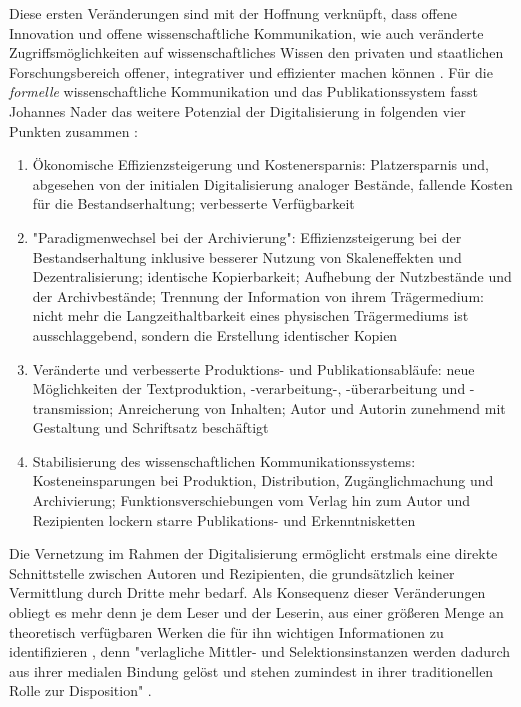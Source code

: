 Diese ersten Veränderungen sind mit der Hoffnung verknüpft, dass offene Innovation und offene wissenschaftliche Kommunikation, wie auch veränderte Zugriffsmöglichkeiten auf wissenschaftliches Wissen \cite[:109]{Naeder_2010} den privaten und staatlichen Forschungsbereich offener, integrativer und effizienter machen können \cite{Harmon_2012}. Für die \textit{formelle} wissenschaftliche Kommunikation und das Publikationssystem fasst Johannes Nader das weitere Potenzial der Digitalisierung in folgenden vier Punkten zusammen \cite[:66-76]{Naeder_2010}:
\begin{enumerate}
\item Ökonomische Effizienzsteigerung und Kostenersparnis: Platzersparnis und, abgesehen von der initialen Digitalisierung analoger Bestände, fallende Kosten für die Bestandserhaltung; verbesserte Verfügbarkeit
\item "Paradigmenwechsel bei der Archivierung": Effizienzsteigerung bei der Bestandserhaltung inklusive besserer Nutzung von Skaleneffekten und Dezentralisierung; identische Kopierbarkeit; Aufhebung der Nutzbestände und der Archivbestände; Trennung der Information von ihrem Trägermedium: nicht mehr die Langzeithaltbarkeit eines physischen Trägermediums ist ausschlaggebend, sondern die Erstellung identischer Kopien
\item Veränderte und verbesserte Produktions- und Publikationsabläufe: neue Möglichkeiten der Textproduktion, -verarbeitung-, -überarbeitung und -transmission; Anreicherung von Inhalten; Autor und Autorin zunehmend mit Gestaltung und Schriftsatz beschäftigt
\item Stabilisierung des wissenschaftlichen Kommunikationssystems: Kosteneinsparungen bei Produktion, Distribution, Zugänglichmachung und Archivierung; Funktionsverschiebungen vom Verlag hin zum Autor und Rezipienten lockern starre Publikations- und Erkenntnisketten
\end{enumerate}

Die Vernetzung im Rahmen der Digitalisierung ermöglicht erstmals eine direkte Schnittstelle zwischen Autoren und Rezipienten, die grundsätzlich keiner Vermittlung durch Dritte mehr bedarf. Als Konsequenz dieser Veränderungen obliegt es mehr denn je dem Leser und der Leserin, aus einer größeren Menge an theoretisch verfügbaren Werken die für ihn wichtigen Informationen zu identifizieren \cite{Hagner_2015}, denn "verlagliche Mittler- und Selektionsinstanzen werden dadurch aus ihrer medialen Bindung gelöst und stehen zumindest in ihrer traditionellen Rolle zur Disposition" \cite[:109]{Naeder_2010}.

